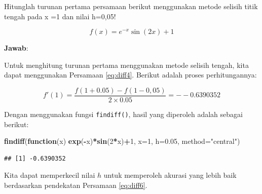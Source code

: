 \documentclass[]{book}
\newenvironment{Shaded}{\begin{snugshade}}{\end{snugshade}}
\newcommand{\ControlFlowTok}[1]{\textcolor[rgb]{0.13,0.29,0.53}{\textbf{#1}}}
\newcommand{\DataTypeTok}[1]{\textcolor[rgb]{0.13,0.29,0.53}{#1}}
\newcommand{\DecValTok}[1]{\textcolor[rgb]{0.00,0.00,0.81}{#1}}
\newcommand{\FloatTok}[1]{\textcolor[rgb]{0.00,0.00,0.81}{#1}}
\newcommand{\KeywordTok}[1]{\textcolor[rgb]{0.13,0.29,0.53}{\textbf{#1}}}
\newcommand{\NormalTok}[1]{#1}
\newcommand{\OperatorTok}[1]{\textcolor[rgb]{0.81,0.36,0.00}{\textbf{#1}}}
\newcommand{\StringTok}[1]{\textcolor[rgb]{0.31,0.60,0.02}{#1}}
\theoremstyle{definition}
\theoremstyle{definition}
\theoremstyle{definition}
\theoremstyle{remark}
\let\BeginKnitrBlock\begin \let\EndKnitrBlock\end
\begin{document}
\BeginKnitrBlock{example}
\protect\hypertarget{exm:diffexm}{}{\label{exm:diffexm} }Hitunglah turunan pertama persamaan berikut menggunakan metode selisih titik tengah pada x =1 dan nilai h=0,05!
\EndKnitrBlock{example}

\[
f\left(x\right)=e^{-x}\sin\left(2x\right)+1
\]

\textbf{Jawab}:

Untuk menghitung turunan pertama menggunakan metode selisih tengah, kita dapat menggunakan Persamaan \eqref{eq:diff4}. Berikut adalah proses perhitungannya:

\[
f'\left(1\right) = \frac{f\left(1+0.05\right)-f\left(1-0,05\right)}{2\times0.05}=--0.6390352
\]

Dengan menggunakan fungsi \texttt{findiff()}, hasil yang diperoleh adalah sebagai berikut:

\begin{Shaded}
\begin{Highlighting}[]
\KeywordTok{findiff}\NormalTok{(}\ControlFlowTok{function}\NormalTok{(x)}
  \KeywordTok{exp}\NormalTok{(}\OperatorTok{-}\NormalTok{x)}\OperatorTok{*}\KeywordTok{sin}\NormalTok{(}\DecValTok{2}\OperatorTok{*}\NormalTok{x)}\OperatorTok{+}\DecValTok{1}\NormalTok{, }\DataTypeTok{x=}\DecValTok{1}\NormalTok{, }\DataTypeTok{h=}\FloatTok{0.05}\NormalTok{,}
  \DataTypeTok{method=}\StringTok{"central"}\NormalTok{)}
\end{Highlighting}
\end{Shaded}

\begin{verbatim}
## [1] -0.6390352
\end{verbatim}

Kita dapat memperkecil nilai \(h\) untuk memperoleh akurasi yang lebih baik berdasarkan pendekatan Persamaan \eqref{eq:diff6}.

\begin{Shaded}
\end{Shaded}
\end{document}
